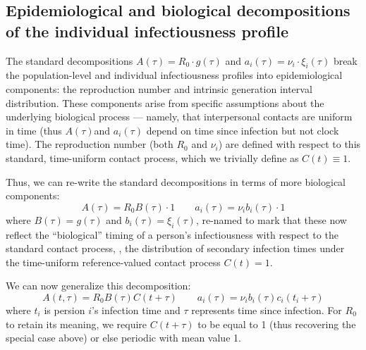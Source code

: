 
\subsection{Epidemiological and biological decompositions of the individual infectiousness profile}

The standard decompositions $A(\tau) = R_0 \cdot g(\tau)$ and $a_i(\tau) = \nu_i \cdot \xi_i(\tau)$ break the population-level and individual infectiousness profiles into epidemiological components: the reproduction number and intrinsic generation interval distribution. These components arise from specific assumptions about the underlying biological process --- namely, that interpersonal contacts are uniform in time (thus $A(\tau) $and $a_i(\tau)$ depend on time since infection but not clock time). The reproduction number (both $R_0$ and $\nu_i$) are defined with respect to this standard, time-uniform contact process, which we trivially define as $C(t) \equiv 1$.

Thus, we can re-write the standard decompositions in terms of more biological components: 
\begin{equation}
    A(\tau) = R_0 B(\tau) \cdot 1 \qquad a_i(\tau) = \nu_i b_i(\tau) \cdot 1 
\end{equation}
where $B(\tau) = g(\tau)$ and $b_i(\tau) = \xi_i(\tau)$, re-named to mark that these now reflect the ``biological'' timing of a person's infectiousness with respect to the standard contact process, \ie, the distribution of secondary infection times under the time-uniform reference-valued contact process $C(t) = 1$. 

We can now generalize this decomposition: 
\begin{equation}
    A(t, \tau) = R_0 B(\tau) C(t+\tau) \qquad a_i(\tau) = \nu_i b_i(\tau) c_i(t_i + \tau) 
\end{equation}
where $t_i$ is persion $i$'s infection time and $\tau$ represents time since infection. For $R_0$ to retain its meaning, we require $C(t + \tau)$ to be equal to 1 (thus recovering the special case above) or else periodic with mean value 1. 

\vspace{5cm} 

